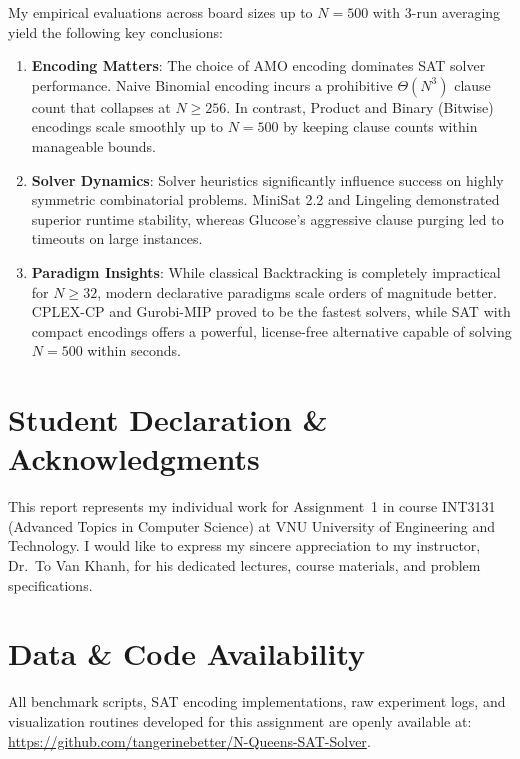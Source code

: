 \documentclass[a4paper,fleqn]{cas-sc}
\begin{document}
My empirical evaluations across board sizes up to $N = 500$ with 3-run averaging yield the following key conclusions:
\begin{enumerate}[label=(\arabic*),noitemsep]
    \item \textbf{Encoding Matters}: The choice of AMO encoding dominates SAT solver performance. Naive Binomial encoding incurs a prohibitive $\Theta(N^3)$ clause count that collapses at $N \ge 256$. In contrast, Product and Binary (Bitwise) encodings scale smoothly up to $N = 500$ by keeping clause counts within manageable bounds.
    \item \textbf{Solver Dynamics}: Solver heuristics significantly influence success on highly symmetric combinatorial problems. MiniSat 2.2 and Lingeling demonstrated superior runtime stability, whereas Glucose's aggressive clause purging led to timeouts on large instances.
    \item \textbf{Paradigm Insights}: While classical Backtracking is completely impractical for $N \ge 32$, modern declarative paradigms scale orders of magnitude better. CPLEX-CP and Gurobi-MIP proved to be the fastest solvers, while SAT with compact encodings offers a powerful, license-free alternative capable of solving $N = 500$ within seconds.
\end{enumerate}

\section*{Student Declaration \& Acknowledgments}
This report represents my individual work for Assignment~1 in course INT3131 (Advanced Topics in Computer Science) at VNU University of Engineering and Technology. I would like to express my sincere appreciation to my instructor, Dr.~To Van Khanh, for his dedicated lectures, course materials, and problem specifications.

\section*{Data \& Code Availability}
All benchmark scripts, SAT encoding implementations, raw experiment logs, and visualization routines developed for this assignment are openly available at: \url{https://github.com/tangerinebetter/N-Queens-SAT-Solver}.
\end{document}
